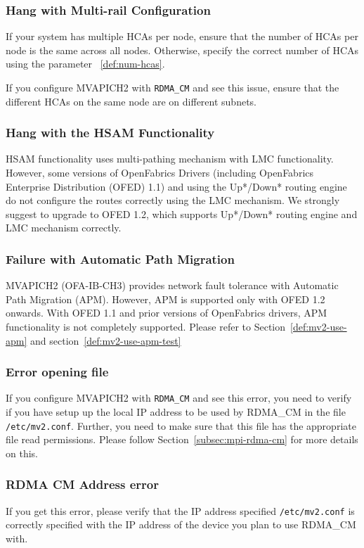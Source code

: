 \subsubsection{Hang with Multi-rail Configuration}
If your system has multiple HCAs per node, ensure that the number of
HCAs per node is the same across all nodes. Otherwise, specify the
correct number of HCAs using the parameter ~\ref{def:num-hcas}.

If you configure MVAPICH2 with \texttt{RDMA\_CM} and see this issue,
ensure that the different HCAs on the same node are on different
subnets.

\subsubsection{Hang with the HSAM Functionality}
HSAM functionality uses multi-pathing mechanism with LMC functionality.
However, some versions of OpenFabrics Drivers (including OpenFabrics
Enterprise Distribution (OFED) 1.1) and using the Up*/Down* routing
engine do not configure the routes correctly using the LMC mechanism.
We strongly suggest to upgrade to OFED 1.2, which supports Up*/Down*
routing engine and LMC mechanism correctly.

\subsubsection{Failure with Automatic Path Migration}
MVAPICH2 (OFA-IB-CH3) provides network fault tolerance 
with Automatic Path Migration
(APM). However, APM is supported only with OFED 1.2 onwards. With OFED
1.1 and prior versions of OpenFabrics drivers, APM functionality is not
completely supported. Please refer to Section~\ref{def:mv2-use-apm} and
section~\ref{def:mv2-use-apm-test}

\subsubsection{Error opening file}
If you configure MVAPICH2 with \texttt{RDMA\_CM} and see this error,
you need to verify if you have setup up the local IP address to be
used by RDMA\_CM in the file \texttt{/etc/mv2.conf}. Further, you need
to make sure that this file has the appropriate file read permissions.
Please follow Section~\ref{subsec:mpi-rdma-cm} for more details on this.

\subsubsection{RDMA CM Address error}
If you get this error, please verify that the IP address specified
\texttt{/etc/mv2.conf} is correctly specified with the IP address of
the device you plan to use RDMA\_CM with.

